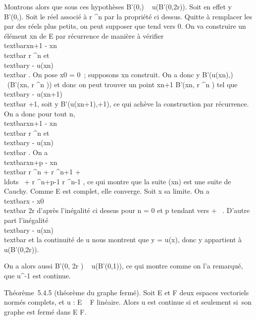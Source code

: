 Montrons alors que sous ces hypothèses B'(0,\rho) \subset~ u(B'(0,2r)). Soit en
effet y \in B'(0,\rho). Soit \rhon le réel associé à  r
^n par la propriété ci dessus. Quitte
à remplacer les \rhon par des réels plus petits, on peut supposer
que \rhon tend vers 0. On va construire un élément xn
de E par récurrence de manière à vérifier
\\textbar{}xn+1 -
xn\\textbar{} \leq r ^n et \\textbar{}y -
u(xn)\\textbar{} \leq \rhon. On pose
x0 = 0~; supposons xn construit. On a donc y \in
B'(u(xn),\rhon)
\subset~\overlineu(B'(xn, r ^n )) et donc on peut trouver un point xn+1 \in
B'(xn, r ^n ) tel que
\\textbar{}y -
u(xn+1)\\textbar{} \leq \rhon+1, soit y \in
B'(u(xn+1),\rhon+1), ce qui achève la construction par
récurrence. On a donc pour tout n,
\\textbar{}xn+1 -
xn\\textbar{} \leq r ^n et \\textbar{}y -
u(xn)\\textbar{} \leq \rhon. On a
\\textbar{}xn+p -
xn\\textbar{} \leq r ^n + r ^n+1 +
\\ldots~ + r
^n+p-1 \leq r ^n-1 , ce qui montre que la suite (xn) est une
suite de Cauchy. Comme E est complet, elle converge. Soit x sa limite.
On a \\textbar{}x -
x0\\textbar{} \leq 2r d'après l'inégalité ci
dessus pour n = 0 et p tendant vers + \infty~. D'autre part l'inégalité
\\textbar{}y - u(xn)\\textbar{}
\leq \rhon et la continuité de u nous montrent que y = u(x), donc y
appartient à u(B'(0,2r)).

On a alors aussi B'(0, \rho \over 2r ) \subset~ u(B'(0,1)), ce
qui montre comme on l'a remarqué, que u^-1 est continue.

Théorème~5.4.5 (théorème du graphe fermé). Soit E et F deux espaces
vectoriels normés complets, et u : E \rightarrow~ F linéaire. Alors u est continue
si et seulement si~son graphe est fermé dans E \times F.

